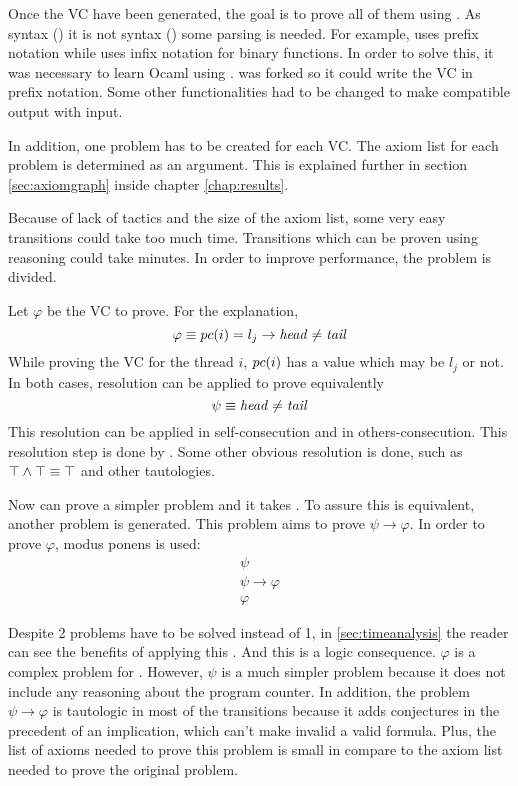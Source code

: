 Once the \gls{VC} have been generated, the goal is to prove all of them using \spass. 
%
As \spass syntax (\cite{spasssyntax}) it is not \leap syntax (\cite{leapsyntax}) some parsing is needed. 
%
For example, \spass uses prefix notation while \leap uses infix notation for binary functions.
%
In order to solve this, it was necessary to learn Ocaml using .
%
\leap was forked so it could write the \gls{VC} in prefix notation.
%
Some other \leap functionalities had to be changed to make compatible \leap output with \spass input.

In addition, one \spass problem has to be created for each \gls{VC}. 
%
The axiom list for each problem is determined as an argument. 
%
This is explained further in section \ref{sec:axiomgraph} inside chapter \ref{chap:results}.

Because of \spass lack of tactics and the size of the axiom list, some very easy transitions could take too much time.
%
Transitions which can be proven using \pc reasoning \spass could take minutes. 
%
In order to improve \spass performance, the problem is divided.

Let $\varphi$ be the \gls{VC} to prove. For the explanation, 
	\[
		\varphi \equiv pc(i) = l_j \to \mathit{head} \not = \mathit{tail}
	\]
While proving the \gls{VC} for the thread $i$, $pc(i)$ has a value which may be $l_j$ or not. 
%
In both cases, resolution can be applied to prove equivalently
	\[
		\psi \equiv \mathit{head} \not = \mathit{tail}
	\]
This resolution can be applied in self-consecution and in others-consecution. 
%
This resolution step is done by \gandalf. 
%
Some other obvious resolution is done, such as $\top \wedge \top \equiv \top$ and other tautologies.

Now \spass can prove a simpler problem and it takes .
%
To assure this is equivalent, another \spass problem is generated. 
%
This \spass problem aims to prove $\psi \to \varphi$.
%
In order to prove $\varphi$, modus ponens is used:
\[
	\begin{array}{c}
		\psi\\
		\psi \to \varphi\\\hline
		\varphi
	\end{array}
\]

Despite 2 \spass problems have to be solved instead of 1, in \ref{sec:timeanalysis} the reader can see the benefits of applying this .
%
And this is a logic consequence. $\varphi$ is a complex problem for \spass. 
%
However, $\psi$ is a much simpler problem because it does not include any reasoning about the program counter. 
In addition, the problem $\psi \to \varphi$ is tautologic in most of the transitions because it adds conjectures in the precedent of an implication, which can't make invalid a valid formula.
%
Plus, the list of axioms needed to prove this problem is small in compare to the axiom list needed to prove the original problem.

